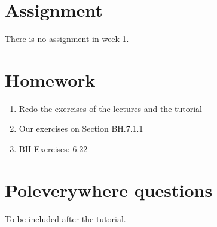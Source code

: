 \documentclass[a4paper,11pt]{article}
\begin{document}
\section{Assignment}
\label{sec:assignment}

There is no assignment in week 1.


\section{Homework}
\label{sec:homework}

\begin{enumerate}
\item Redo the exercises of the lectures and the tutorial
\item Our exercises on Section BH.7.1.1
\item BH Exercises: 6.22
\end{enumerate}



\section{Poleverywhere questions}
\label{sec:polev-quest}

To be included after the tutorial.


\end{document}
